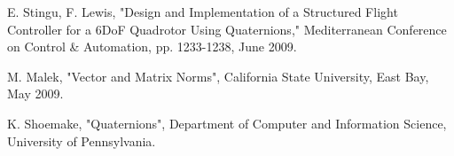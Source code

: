 \documentclass{article}
\numberwithin{equation}{section} %
\begin{document}
%
%
%
%


\begin{thebibliography}{99}


	E. Stingu, F. Lewis, 
	"Design and Implementation of a Structured Flight Controller for a 6DoF Quadrotor Using Quaternions," 
Mediterranean Conference on Control \& Automation, pp. 1233-1238, June 2009.


	M. Malek,
	"Vector and Matrix Norms", California State University, East Bay, May 2009.
	
	K. Shoemake,
	"Quaternions", Department of Computer and Information Science, University of Pennsylvania.
	
	
	
\end{thebibliography}
\end{document}
